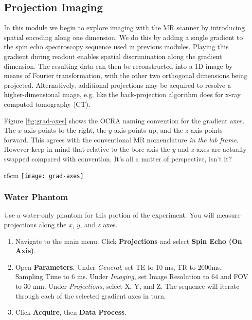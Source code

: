 \newpage
\subsection{Projection Imaging}

In this module we begin to explore imaging with the MR scanner by introducing spatial encoding along one dimension. We do this by adding a single gradient to the spin echo spectroscopy sequence used in previous modules. Playing this gradient during readout enables spatial discrimination along the gradient dimension. The resulting data can then be reconstructed into a 1D image by means of Fourier transformation, with the other two orthogonal dimensions being projected. Alternatively, additional projections may be acquired to resolve a higher-dimensional image, e.g. like the back-projection algorithm does for x-ray computed tomography (CT).

Figure \ref{fig:grad-axes} shows the OCRA naming convention for the gradient axes. The $x$ axis points to the right, the $y$ axis points up, and the $z$ axis points forward. This agrees with the conventional MR nomenclature \emph{in the lab frame}. However keep in mind that relative to the bore axis the $y$ and $z$ axes are actually swapped compared with convention. It's all a matter of perspective, isn't it?

\begin{wrapfigure}{r}{6cm}
    \centering
    \vspace{-10mm}
    \texttt{[image: grad-axes]}
    \caption{\label{fig:grad-axes} OCRA naming convention for gradient axes with sample bore in blue.}
    \vspace{-10mm}
\end{wrapfigure}

\subsubsection{Water Phantom}
Use a water-only phantom for this portion of the experiment. You will measure projections along the $x$, $y$, and $z$ axes.

\begin{enumerate}
    \item   Navigate to the main menu. Click \textbf{Projections} and select \textbf{Spin Echo (On Axis)}.
    \item   Open \textbf{Parameters}. Under \emph{General}, set TE to 10 ms, TR to 2000ms, Sampling Time to 6 ms. Under \emph{Imaging}, set Image Resolution to 64 and FOV to 30 mm. Under \emph{Projections}, select X, Y, and Z. The sequence will iterate through each of the selected gradient axes in turn.
    \item   Click \textbf{Acquire}, then \textbf{Data Process}.
\end{enumerate}

